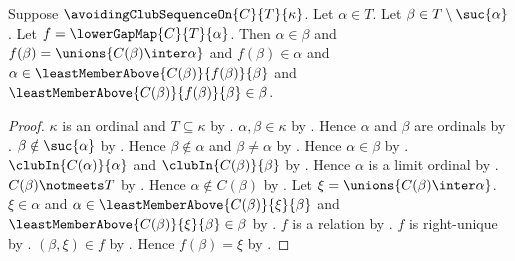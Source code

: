 \begin{proposition}\label{lower_gap_map_value_properties}
    Suppose $\avoidingClubSequenceOn{C}{T}{\kappa}$.
    Let $\alpha\in T$.
    Let $\beta\in T\setminus\suc{\alpha}$.
    Let $f=\lowerGapMap{C}{T}{\alpha}$.
    Then $\alpha\in\beta$ and
        $f(\beta)=\unions{C(\beta)\inter\alpha}$ and
        $f(\beta)\in\alpha$ and
        $\alpha\in\leastMemberAbove{C(\beta)}{f(\beta)}{\beta}$ and
        $\leastMemberAbove{C(\beta)}{f(\beta)}{\beta}\in\beta$.
\end{proposition}
\begin{proof}
    $\kappa$ is an ordinal and $T\subseteq\kappa$
        by .
    $\alpha,\beta\in\kappa$ by .
    Hence $\alpha$ and $\beta$ are ordinals
        by .
    $\beta\notin\suc{\alpha}$ by .
    Hence $\beta\notin\alpha$ and $\beta\neq\alpha$ by .
    Hence $\alpha\in\beta$ by .
    $\clubIn{C(\alpha)}{\alpha}$ and $\clubIn{C(\beta)}{\beta}$
        by .
    Hence $\alpha$ is a limit ordinal by .
    $C(\beta)\notmeets T$
        by .
    Hence $\alpha\notin C(\beta)$ by .
    Let $\xi=\unions{C(\beta)\inter\alpha}$.
    $\xi\in\alpha$ and
        $\alpha\in\leastMemberAbove{C(\beta)}{\xi}{\beta}$ and
        $\leastMemberAbove{C(\beta)}{\xi}{\beta}\in\beta$
        by .
    $f$ is a relation by .
    $f$ is right-unique
        by .
    $(\beta,\xi)\in f$ by .
    Hence $f(\beta)=\xi$ by .
\end{proof}

